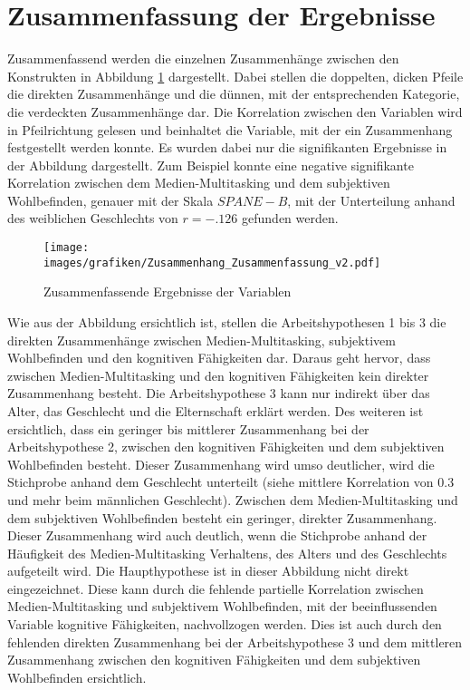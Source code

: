\section{Zusammenfassung der Ergebnisse}\label{label.ergebnisse.zusammenfassung}
Zusammenfassend werden die einzelnen Zusammenhänge zwischen den Konstrukten in Abbildung \ref{pic.ergebniss.zusammenfassung} dargestellt. Dabei stellen die doppelten, dicken Pfeile die direkten Zusammenhänge und die dünnen, mit der entsprechenden Kategorie, die verdeckten Zusammenhänge dar. Die Korrelation zwischen den Variablen wird in Pfeilrichtung gelesen und beinhaltet die Variable, mit der ein Zusammenhang festgestellt werden konnte. Es wurden dabei nur die signifikanten Ergebnisse in der Abbildung dargestellt. Zum Beispiel konnte eine negative signifikante Korrelation zwischen dem Medien-Multitasking und dem subjektiven Wohlbefinden, genauer mit der Skala $SPANE-B$, mit der Unterteilung anhand des weiblichen Geschlechts von $r=-.126$ gefunden werden.
\begin{figure}[ht]
    \centering
    \texttt{[image: images/grafiken/Zusammenhang\_Zusammenfassung\_v2.pdf]}
     \caption{Zusammenfassende Ergebnisse der Variablen}
     \label{pic.ergebniss.zusammenfassung}
\end{figure}
Wie aus der Abbildung ersichtlich ist, stellen die Arbeitshypothesen 1 bis 3 die direkten Zusammenhänge zwischen Medien-Multitasking, subjektivem Wohlbefinden und den kognitiven Fähigkeiten dar. Daraus geht hervor, dass zwischen Medien-Multitasking und den kognitiven Fähigkeiten kein direkter Zusammenhang besteht. Die Arbeitshypothese 3 kann nur indirekt über das Alter, das Geschlecht und die Elternschaft erklärt werden. Des weiteren ist ersichtlich, dass ein geringer bis mittlerer Zusammenhang bei der Arbeitshypothese 2, zwischen den kognitiven Fähigkeiten und dem subjektiven Wohlbefinden besteht. Dieser Zusammenhang wird umso deutlicher, wird die Stichprobe anhand dem Geschlecht unterteilt (siehe mittlere Korrelation von 0.3 und mehr beim männlichen Geschlecht). Zwischen dem Medien-Multitasking und dem subjektiven Wohlbefinden besteht ein geringer, direkter Zusammenhang. Dieser Zusammenhang wird auch deutlich, wenn die Stichprobe anhand der Häufigkeit des Medien-Multitasking Verhaltens, des Alters und des Geschlechts aufgeteilt wird. Die Haupthypothese ist in dieser Abbildung nicht direkt eingezeichnet. Diese kann durch die fehlende partielle Korrelation zwischen Medien-Multitasking und subjektivem Wohlbefinden, mit der beeinflussenden Variable kognitive Fähigkeiten, nachvollzogen werden. Dies ist auch durch den fehlenden direkten Zusammenhang bei der Arbeitshypothese 3 und dem mittleren Zusammenhang zwischen den kognitiven Fähigkeiten und dem subjektiven Wohlbefinden ersichtlich.  




